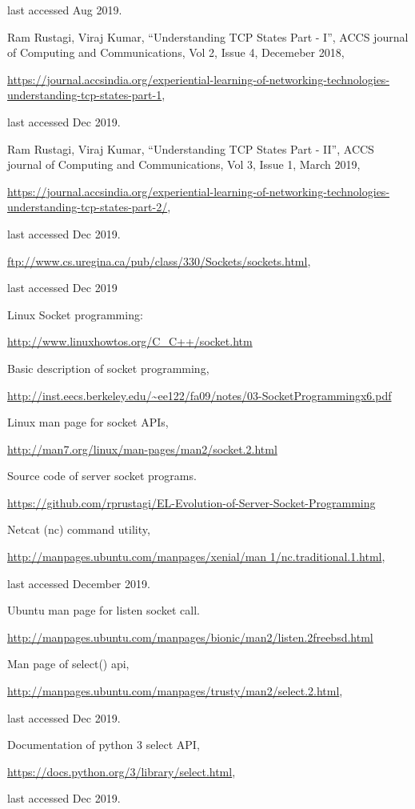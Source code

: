 \begin{multicols}{2}
\begin{thebibliography}{99}
 last accessed Aug 2019.

 Ram Rustagi, Viraj Kumar, “Understanding TCP States Part - I”, ACCS journal of Computing and Communications, Vol 2, Issue 4, Decemeber 2018,

\url{https://journal.accsindia.org/experiential-learning-of-networking-technologies-understanding-tcp-states-part-1},

last accessed Dec 2019.

 Ram Rustagi, Viraj Kumar, “Understanding TCP States Part - II”, ACCS journal of Computing and Communications, Vol 3, Issue 1, March 2019,

\url{https://journal.accsindia.org/experiential-learning-of-networking-technologies-understanding-tcp-states-part-2/},

last accessed Dec 2019.

 \url{ftp://www.cs.uregina.ca/pub/class/330/Sockets/sockets.html},

last accessed Dec 2019

 Linux Socket programming:

\url{http://www.linuxhowtos.org/C_C++/socket.htm}

 Basic description of socket programming, 

\url{http://inst.eecs.berkeley.edu/~ee122/fa09/notes/03-SocketProgrammingx6.pdf}

 Linux man page for socket APIs,

\url{http://man7.org/linux/man-pages/man2/socket.2.html}

  Source code of server socket programs. 

\url{https://github.com/rprustagi/EL-Evolution-of-Server-Socket-Programming}

 Netcat (nc) command utility,

\url{http://manpages.ubuntu.com/manpages/xenial/man 1/nc.traditional.1.html},

last accessed December 2019.

 Ubuntu man page for listen socket call. 

\url{http://manpages.ubuntu.com/manpages/bionic/man2/listen.2freebsd.html}

 Man page of select() api,

\url{http://manpages.ubuntu.com/manpages/trusty/man2/select.2.html},

last accessed Dec 2019.

 Documentation of python 3 select API,

\url{https://docs.python.org/3/library/select.html},

last accessed Dec 2019.
\end{thebibliography}
\end{multicols}

